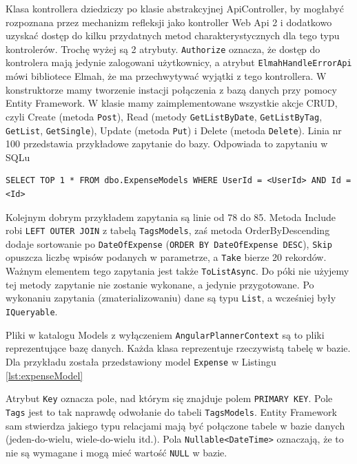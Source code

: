 \documentclass[10pt,titlepage]{article}
\begin{document}

\par Klasa kontrollera dziedziczy po klasie abstrakcyjnej ApiController, by mogłabyć rozpoznana przez mechanizm refleksji jako kontroller Web Api 2 i dodatkowo uzyskać dostęp do kilku przydatnych metod charakterystycznych dla tego typu kontrolerów. Trochę wyżej są 2 atrybuty. \verb|Authorize| oznacza, że dostęp do kontrolera mają jedynie zalogowani użytkownicy, a atrybut \verb|ElmahHandleErrorApi| mówi bibliotece Elmah, że ma przechwytywać wyjątki z tego kontrollera. W konstruktorze mamy tworzenie instacji połączenia z bazą danych przy pomocy Entity Framework. W klasie mamy zaimplementowane wszystkie akcje CRUD, czyli Create (metoda \verb|Post|), Read (metody \verb|GetListByDate|, \verb|GetListByTag|, \verb|GetList|, \verb|GetSingle|), Update (metoda \verb|Put|) i Delete (metoda \verb|Delete|). Linia nr 100 przedstawia przykładowe zapytanie do bazy. Odpowiada to zapytaniu w SQLu
\begin{verbatim}
SELECT TOP 1 * FROM dbo.ExpenseModels WHERE UserId = <UserId> AND Id = <Id>
\end{verbatim}
Kolejnym dobrym przykładem zapytania są linie od 78 do 85. Metoda Include robi \verb|LEFT OUTER JOIN| z tabelą \verb|TagsModels|, zaś metoda OrderByDescending dodaje sortowanie po \verb|DateOfExpense| (\verb|ORDER BY DateOfExpense DESC|), \verb|Skip| opuszcza liczbę wpisów podanych w parametrze, a \verb|Take| bierze 20 rekordów. Ważnym elementem tego zapytania jest także \verb|ToListAsync|. Do póki nie użyjemy tej metody zapytanie nie zostanie wykonane, a jedynie przygotowane. Po wykonaniu zapytania (zmaterializowaniu) dane są typu \verb|List|, a wcześniej były \verb|IQueryable|.

\par Pliki w katalogu Models z wyłączeniem \verb|AngularPlannerContext| są to pliki reprezentujące bazę danych. Każda klasa reprezentuje rzeczywistą tabelę w bazie. Dla przykładu została przedstawiony model \verb|Expense| w Listingu \ref{lst:expenseModel}

Atrybut \verb|Key| oznacza pole, nad którym się znajduje polem \verb|PRIMARY KEY|. Pole \verb|Tags| jest to tak naprawdę odwołanie do tabeli \verb|TagsModels|. Entity Framework sam stwierdza jakiego typu relacjami mają być połączone tabele w bazie danych (jeden-do-wielu, wiele-do-wielu itd.). Pola \verb|Nullable<DateTime>| oznaczają, że to nie są wymagane i mogą mieć wartość \verb|NULL| w bazie.
\end{document}
